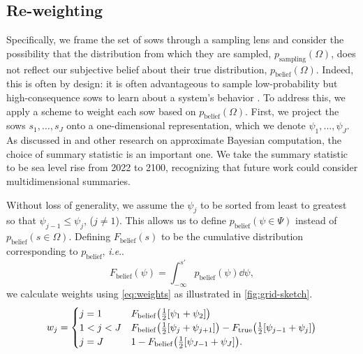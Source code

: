 \documentclass[12pt]{article}
\makeatletter
\DeclareRobustCommand\onedot{\futurelet\@let@token\@onedot}
\def\@onedot{\ifx\@let@token.\else.\null\fi\xspace}
\def\ie{\emph{i.e}\onedot} \def\Ie{\emph{I.e}\onedot}
\DeclareRobustCommand\onedot{\futurelet\@let@token\@onedot}
\def\@onedot{\ifx\@let@token.\else.\null\fi\xspace}
\def\ie{\emph{i.e}\onedot} \def\Ie{\emph{I.e}\onedot}
\makeatother
\begin{document}
\subsection{Re-weighting}

Specifically, we frame the set of \glspl{sow} through a sampling lens and consider the possibility that the distribution from which they are sampled, $p_\textrm{sampling}(\Omega)$, does not reflect our subjective belief about their true distribution, $p_\mathrm{belief}(\Omega)$.
Indeed, this is often by design: it is often advantageous to sample low-probability but high-consequence \glspl{sow} to learn about a system's behavior \citep{bankes:1993}.
To address this, we apply a scheme to weight each \gls{sow} based on $p_\mathrm{belief}(\Omega)$.
First, we project the \glspl{sow} $s_1, \ldots, s_J$ onto a one-dimensional representation, which we denote $\psi_1, \ldots, \psi_J$.
As discussed in \citet{csillery_abc:2010} and other research on approximate Bayesian computation, the choice of summary statistic is an important one.
We take the summary statistic to be sea level rise from 2022 to 2100, recognizing that future work could consider multidimensional summaries.

Without loss of generality, we assume the $\psi_j$ to be sorted from least to greatest so that $\psi_{j-1} \leq \psi_j$, ($j \neq 1$).
This allows us to define $p_\mathrm{belief}(\psi \in \Psi)$ instead of $p_\mathrm{belief}(s \in \Omega)$.
Defining $F_\mathrm{belief}(s)$ to be the cumulative distribution corresponding to $p_\mathrm{belief}$, \ie
$$
    F_\mathrm{belief}(\psi) = \int_{-\infty}^{s'} p_\mathrm{belief}(\psi) \dd{\psi},
$$
we calculate weights using \cref{eq:weights} as illustrated in \cref{fig:grid-sketch}.
\begin{equation}\label{eq:weights}
    w_j = \begin{cases}
        j = 1     & F_\mathrm{belief}\qty(\frac{1}{2}\qty[\psi_1 + \psi_2])                                                                   \\
        1 < j < J & F_\mathrm{belief}\qty(\frac{1}{2}\qty[\psi_{j} + \psi_{j+1}]) - F_\mathrm{true}\qty(\frac{1}{2}\qty[\psi_{j-1} + \psi_j]) \\
        j = J     & 1 - F_\mathrm{belief}\qty(\frac{1}{2}\qty[\psi_{J-1} + \psi_J]).
    \end{cases}
\end{equation}
\end{document}
